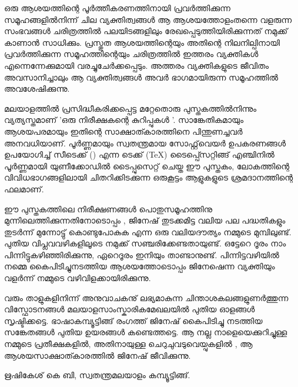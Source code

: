 
ഒരു ആശയത്തിന്റെ പൂര്‍ത്തീകരണത്തിനായി പ്രവര്‍ത്തിക്കുന്ന സമൂഹങ്ങളില്‍നിന്ന് ചില വ്യക്തിത്വങ്ങള്‍ ആ ആശയത്തോളംതന്നെ
വളരുന്ന സംഭവങ്ങള്‍ ചരിത്രത്തില്‍ പലയിടങ്ങളിലും  രേഖപ്പെടുത്തിയിരിക്കുന്നത് നമുക്ക് കാണാൻ സാധിക്കും. പ്രസ്തുത ആശയത്തിന്റെയും  
അതിന്റെ നിലനില്പിനായി പ്രവര്‍ത്തിക്കുന്ന സമൂഹത്തിന്റെയും  ചരിത്രത്തില്‍ ഇത്തരം  വ്യക്തികള്‍ എന്നെന്നേക്കുമായി വരച്ചുചേര്‍ക്കപ്പെടും. 
അത്തരം വ്യക്തികളുടെ ജീവിതം അവസാനിച്ചാലും ആ വ്യക്തിത്വങ്ങള്‍ അവര്‍ ഭാഗമായിരുന്ന സമൂഹത്തില്‍ അവശേഷിക്കുന്നു. 


മലയാളത്തില്‍ പ്രസിദ്ധീകരിക്കപ്പെട്ട മറ്റേതൊരു പുസ്തകത്തില്‍നിന്നും വ്യത്യസ്തമാണ് 'ഒരു നിരീക്ഷകന്റെ കുറിപ്പുകള്‍ '. 
സാങ്കേതികമായും ആശയപരമായും ഇതിന്റെ സാക്ഷാത്കാരത്തിനെ പിന്തുണച്ചവര്‍ അനവധിയാണ്. പൂര്‍ണ്ണമായും സ്വതന്ത്രമായ 
സോഫ്റ്റ്‌‌വെയര്‍ ഉപകരണങ്ങള്‍ ഉപയോഗിച്ച് സീടെക്ക് (\XeTeX) എന്ന ടെക്ക് (\TeX) ടൈപ്പ്സെറ്റിങ്ങ് എഞ്ചിനില്‍ പൂര്‍ണ്ണമായി യുണീക്കോഡില്‍ ടൈപ്പുസെറ്റ് ചെയ്ത
ഈ പുസ്തകം, ലോകത്തിന്റെ വിവിധഭാഗങ്ങളിലായി ചിതറിക്കിടക്കുന്ന ഒരുകൂട്ടം ആളുകളുടെ ശ്രമദാനത്തിന്റെ ഫലമാണ്.   

ഈ പുസ്തകത്തിലെ നിരീക്ഷണങ്ങള്‍ പൊതുസമൂഹത്തിനു മുന്നിലെത്തിക്കുന്നതിനോടൊപ്പം , ജിനേഷ് തുടക്കമിട്ട വലിയ പല പദ്ധതികളും  
തുടര്‍ന്ന് മുന്നോട്ടു് കൊണ്ടുപോകുക എന്ന ഒരു വലിയദൗത്യം  നമ്മുടെ മുമ്പിലുണ്ട്. പുതിയ വിപ്ലവവഴികളിലൂടെ നമുക്ക് സഞ്ചരിക്കേണ്ടതായുണ്ട്. 
ഒട്ടേറെ ദൂരം നാം പിന്നിട്ടുകഴിഞ്ഞിരിക്കുന്നു, ഏറെദൂരം ഇനിയും താണ്ടാനുണ്ട്. പിന്നിട്ടവഴിയില്‍ നമ്മെ കൈപിടിച്ചുനടത്തിയ ആശയത്തോടൊപ്പം  
ജിനേഷെന്ന വ്യക്തിയും  വളര്‍ന്ന് നമ്മുടെ വഴിവിളക്കായിരിക്കുന്നു.

വരും  താളുകളിനിന്ന് അനുവാചകനു് ലഭ്യമാകുന്ന ചിന്താശകലങ്ങളുണര്‍ത്തുന്ന വിസ്ഫോടനങ്ങള്‍ മലയാളസാംസ്കാരികമേഖലയില്‍ പുതിയ ഓളങ്ങള്‍ സൃഷ്ടിക്കട്ടെ. 
ഭാഷാകമ്പ്യൂട്ടിങ്ങ് രംഗത്ത് ജിനേഷ് കൈപിടിച്ചു നടത്തിയ സങ്കേതങ്ങള്‍ പുതിയ ഉയരങ്ങള്‍ കണ്ടെത്തട്ടെ.  ആ നല്ല നാളെയെക്കുറിച്ചുള്ള നമ്മുടെ പ്രതീക്ഷകളില്‍,
അതിനായുള്ള ചെറുചുവടുവെയ്പുകളില്‍ , ആ ആശയസാക്ഷാത്കാരത്തില്‍ ജിനേഷ് ജീവിക്കുന്നു. 

\hspace*{2em}ഋഷികേശ് കെ ബി,  സ്വതന്ത്രമലയാളം കമ്പ്യൂട്ടിങ്ങ്. 
\newpage




